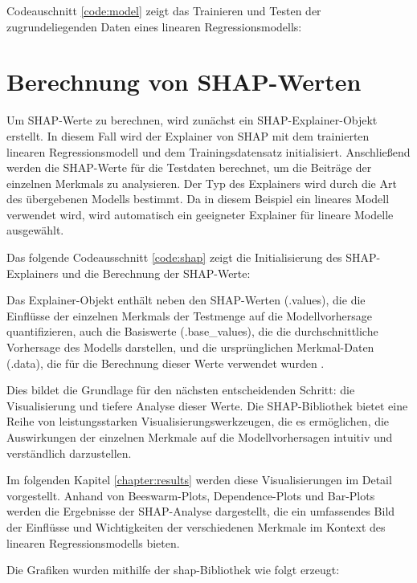 Codeauschnitt \ref{code:model} zeigt das Trainieren und Testen der zugrundeliegenden Daten eines linearen
Regressionsmodells:




\section{Berechnung von SHAP-Werten}

Um SHAP-Werte zu berechnen, wird zunächst ein SHAP-Explainer-Objekt erstellt. In diesem Fall wird der Explainer 
von SHAP mit dem trainierten linearen Regressionsmodell und dem Trainingsdatensatz initialisiert. 
Anschließend werden die SHAP-Werte für die Testdaten berechnet, um die Beiträge der einzelnen Merkmals 
zu analysieren. Der Typ des Explainers wird durch die Art des übergebenen Modells bestimmt. 
Da in diesem Beispiel ein lineares Modell verwendet wird, wird automatisch ein geeigneter Explainer 
für lineare Modelle ausgewählt.

Das folgende Codeausschnitt \ref{code:shap} zeigt die Initialisierung des SHAP-Explainers und die Berechnung der SHAP-Werte:



Das Explainer-Objekt enthält neben den SHAP-Werten (.values), 
die die Einflüsse der einzelnen Merkmals der Testmenge auf die Modellvorhersage quantifizieren, 
auch die Basiswerte (.base\_values), die die durchschnittliche Vorhersage des Modells darstellen, 
und die ursprünglichen Merkmal-Daten (.data), die für die Berechnung dieser Werte verwendet wurden \cite[S. 51]{Molnar_2023}.

Dies bildet die Grundlage für den nächsten entscheidenden Schritt: 
die Visualisierung und tiefere Analyse dieser Werte. Die SHAP-Bibliothek bietet eine 
Reihe von leistungsstarken Visualisierungswerkzeugen, die es ermöglichen, die Auswirkungen 
der einzelnen Merkmale auf die Modellvorhersagen intuitiv und verständlich darzustellen. 

Im folgenden Kapitel \ref{chapter:results} werden diese Visualisierungen im Detail vorgestellt. 
Anhand von Beeswarm-Plots, Dependence-Plots und Bar-Plots werden die Ergebnisse der 
SHAP-Analyse dargestellt, die ein umfassendes Bild der Einflüsse und Wichtigkeiten der 
verschiedenen Merkmale im Kontext des linearen Regressionsmodells bieten.

Die Grafiken wurden mithilfe der \textsf{shap}-Bibliothek wie folgt erzeugt:



